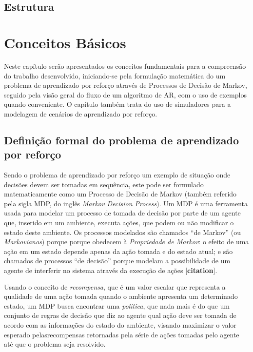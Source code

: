 \documentclass[cic,tc]{iiufrgs}
\begin{document}
\section{Estrutura}
\blindtext


\chapter{Conceitos Básicos}
\label{basic_concepts}
Neste capítulo serão apresentados os conceitos fundamentais para a compreensão
do trabalho desenvolvido, iniciando-se pela formulação matemática do um problema
de aprendizado por reforço através de Processos de Decisão de Markov, seguido
pela visão geral do fluxo de um algoritmo de AR, com o uso de exemplos quando
conveniente. O capítulo também trata do uso de simuladores para a modelagem de
cenários de aprendizado por reforço.

\section{Definição formal do problema de aprendizado por reforço}
\label{markov_process}
Sendo o problema de aprendizado por reforço um exemplo de situação onde decisões
devem ser tomadas em sequência, este pode ser formulado matematicamente como um
Processo de Decisão de Markov (também referido pela sigla MDP, do inglês
\textit{Markov Decision Process}). Um MDP é uma ferramenta usada para modelar
um processo de tomada de decisão por parte de um agente que, inserido em um
ambiente, executa ações, que podem ou não modificar o estado deste ambiente.
Os processos modelados são chamados ``de Markov'' (ou \textit{Markovianos}) porque
porque obedecem à \textit{Propriedade de Markov}: o efeito de uma ação em um
estado depende apenas da ação tomada e do estado atual; e são chamados de
processos ``de decisão''  porque modelam a possibilidade de um agente de
interferir no sistema através da execução de ações [\textbf{citation}].


Usando o conceito de \textit{recompensa}, que é um valor escalar que representa a
qualidade de uma ação tomada quando o ambiente apresenta um determinado estado,
um MDP busca encontrar uma \textit{política}, que nada mais é do que um
conjunto de regras de decisão que diz ao agente qual ação deve ser tomada de
acordo com as informações do estado do ambiente, visando maximizar o valor
esperado pelasrecompensas retornadas pela série de ações tomadas pelo agente até
que o problema seja resolvido.
\end{document}
